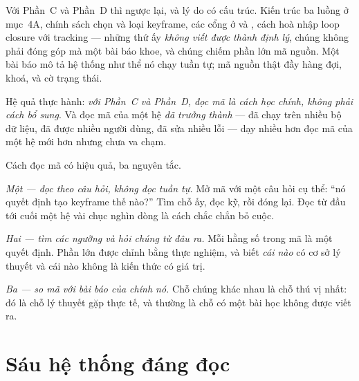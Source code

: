 \documentclass[../../vslam.tex]{subfiles}
\begin{document}
Với Phần~C và Phần~D thì ngược lại, và lý do có cấu trúc. Kiến trúc ba luồng ở  mục~4A, chính sách chọn và loại keyframe, các cổng ở  và , cách hoà nhập loop closure với tracking --- những thứ ấy \emph{không viết được thành định lý}, chúng không phải đóng góp mà một bài báo khoe, và chúng chiếm phần lớn mã nguồn. Một bài báo mô tả hệ thống như thể nó chạy tuần tự; mã nguồn thật đầy hàng đợi, khoá, và cờ trạng thái.

Hệ quả thực hành: \emph{với Phần~C và Phần~D, đọc mã là cách học chính, không phải cách bổ sung}. Và đọc mã của một hệ \emph{đã trưởng thành} --- đã chạy trên nhiều bộ dữ liệu, đã được nhiều người dùng, đã sửa nhiều lỗi --- dạy nhiều hơn đọc mã của một hệ mới hơn nhưng chưa va chạm.

Cách đọc mã có hiệu quả, ba nguyên tắc.

\emph{Một --- đọc theo câu hỏi, không đọc tuần tự.} Mở mã với một câu hỏi cụ thể: ``nó quyết định tạo keyframe thế nào?'' Tìm chỗ ấy, đọc kỹ, rồi đóng lại. Đọc từ đầu tới cuối một hệ vài chục nghìn dòng là cách chắc chắn bỏ cuộc.

\emph{Hai --- tìm các ngưỡng và hỏi chúng từ đâu ra.} Mỗi hằng số trong mã là một quyết định. Phần lớn được chỉnh bằng thực nghiệm, và biết \emph{cái nào} có cơ sở lý thuyết và cái nào không là kiến thức có giá trị.

\emph{Ba --- so mã với bài báo của chính nó.} Chỗ chúng khác nhau là chỗ thú vị nhất: đó là chỗ lý thuyết gặp thực tế, và thường là chỗ có một bài học không được viết ra.

\section{Sáu hệ thống đáng đọc}
\end{document}
